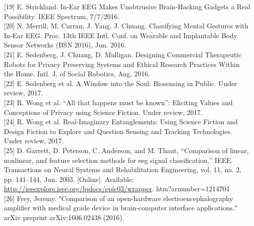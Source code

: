 \documentclass[11pt]{article}
\begin{document}
[19] E. Strickland. In-Ear EEG Makes Unobtrusive Brain-Hacking Gadgets a Real Possibility.
IEEE Spectrum, 7/7/2016.
\hspace{0pt} \\

[20]
N. Merrill, M. Curran, J. Yang, J. Chuang. Classifying Mental Gestures with In-Ear EEG.
Proc. 13th IEEE Intl. Conf. on Wearable and Implantable Body Sensor Networks (BSN
2016), Jun. 2016.
\hspace{0pt} \\

[21]
E. Sedenberg, J. Chuang, D. Mulligan. Designing Commercial Therapeutic Robots for
Privacy Preserving Systems and Ethical Research Practices Within the Home. Intl. J. of
Social Robotics, Aug. 2016.
\hspace{0pt} \\

[22] E. Sedenberg et al. A Window into the Soul: Biosensing in Public. Under review, 2017.
\hspace{0pt} \\

[23] R. Wong et al. “All that happens must be known”: Eliciting Values and Conceptions of
Privacy using Science Fiction. Under review, 2017.
\hspace{0pt} \\

[24]
R. Wong et al. Real-Imaginary Entanglements: Using Science Fiction and Design Fiction to
Explore and Question Sensing and Tracking Technologies. Under review, 2017.
\hspace{0pt} \\

[25] D. Garrett, D. Peterson, C. Anderson, and M. Thaut, “Comparison
of linear, nonlinear, and feature selection methods for eeg
signal classification,” IEEE Transactions on Neural Systems and
Rehabilitation Engineering, vol. 11, no. 2, pp. 141–144, Jun. 2003.
[Online]. Available: \url{http://ieeexplore.ieee.org/lpdocs/epic03/wrapper}.
htm?arnumber=1214704
\hspace{0pt} \\

[26] Frey, Jeremy. "Comparison of an open-hardware electroencephalography amplifier with medical
grade device in brain-computer interface applications." arXiv preprint arXiv:1606.02438 (2016).
\hspace{0pt} \\
\end{document}
